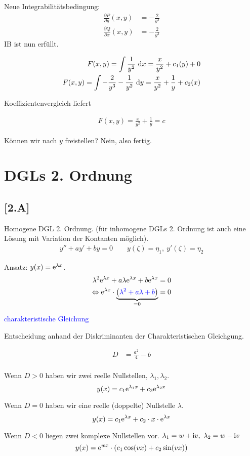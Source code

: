 \documentclass[main.tex]{subfiles}
\begin{document}
Neue Integrabilitätsbedingung:
\begin{align*}
	\frac{\partial P}{\partial y}(x,y) &= - \frac{2}{y^3} \\
	\frac{\partial Q}{\partial x}(x,y) &= - \frac{2}{y^3} 
\end{align*}
IB ist nun erfüllt. 

\begin{align*}
	F(x,y) = \int \frac{1}{y^2} ~\mathrm{d}x = \frac{x}{y^2} + c_1(y) + 0\\
	F(x,y) = \int - \frac{2}{y^3} - \frac{1}{y^2} ~\mathrm{d}y = \frac{x}{y^2} + \frac{1}{y} + c_2(x)
\end{align*}

Koeffizientenvergleich liefert

\begin{align*}
	F(x,y) = \frac{x}{y^2} + \frac{1}{y} = c
\end{align*}

Können wir nach $y$ freistellen? Nein, also fertig. 

\section{DGLs 2. Ordnung}

\subsection*{[2.A]}

Homogene DGL 2. Ordnung. (für inhomogene DGLs 2. Ordnung ist auch eine Lösung mit Variation der Kontanten möglich).
\begin{align*}
	y'' + a y' + by = 0 \qquad y(\zeta) = \eta_1,\ y'(\zeta) = \eta_2
\end{align*}

Ansatz: $y(x) = \mathrm{e}^{\lambda x}$. 
\begin{align*}
	\lambda^2 \mathrm{e}^{\lambda x} + a\lambda \mathrm{e}^{\lambda x} + b\mathrm{e}^{\lambda x} = 0 \\
	\Leftrightarrow \mathrm{e}^{\lambda x} \cdot \underbrace{\left( \textcolor{blue}{\lambda^2 +a\lambda + b} \right)}_{= 0} = 0
\end{align*}

\textcolor{blue}{charakteristische Gleichung}

Entscheidung anhand der Diskriminanten der Charakteristischen Gleichgung.

\begin{align}
	D &= \frac{a^2}{4} -b \\
\end{align}

Wenn $D > 0$ haben wir zwei reelle Nullstellen, $\lambda_1, \lambda_2$.
$$
	y(x) = c_1 \mathrm{e}^{\lambda_1 x} + c_2 \mathrm{e}^{\lambda_2 x} 
$$

Wenn $D = 0$ haben wir eine reelle (doppelte) Nullstelle $\lambda$.
$$
	y(x) = c_1 \mathrm{e}^{\lambda x} + c_2 \cdot x \cdot \mathrm{e}^{\lambda x} 
$$

Wenn $D < 0$ liegen zwei komplexe Nullstellen vor. $\lambda_1 = w + \mathrm{i}v,\ \lambda_2 = w - \mathrm{i}v$
$$
	y(x) = \mathrm{e}^{w x} \cdot \left( c_1 \cos(v x) + c_2 \sin(v x) \right) 
$$
\end{document}
